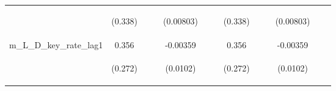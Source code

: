 \documentclass[]{article}
\begin{document}
\begin{center}
\begin{tabular}{lcccccccccccc}
\vspace{4pt} & \begin{footnotesize}(0.338)\end{footnotesize} & \begin{footnotesize}\end{footnotesize} & \begin{footnotesize}\end{footnotesize} & \begin{footnotesize}(0.00803)\end{footnotesize} & \begin{footnotesize}\end{footnotesize} & \begin{footnotesize}\end{footnotesize} & \begin{footnotesize}(0.338)\end{footnotesize} & \begin{footnotesize}\end{footnotesize} & \begin{footnotesize}\end{footnotesize} & \begin{footnotesize}(0.00803)\end{footnotesize} & \begin{footnotesize}\end{footnotesize} & \begin{footnotesize}\end{footnotesize} \\
m\_L\_D\_key\_rate\_lag1 & 0.356 &  &  & -0.00359 &  &  & 0.356 &  &  & -0.00359 &  &  \\
\vspace{4pt} & \begin{footnotesize}(0.272)\end{footnotesize} & \begin{footnotesize}\end{footnotesize} & \begin{footnotesize}\end{footnotesize} & \begin{footnotesize}(0.0102)\end{footnotesize} & \begin{footnotesize}\end{footnotesize} & \begin{footnotesize}\end{footnotesize} & \begin{footnotesize}(0.272)\end{footnotesize} & \begin{footnotesize}\end{footnotesize} & \begin{footnotesize}\end{footnotesize} & \begin{footnotesize}(0.0102)\end{footnotesize} & \begin{footnotesize}\end{footnotesize} & \begin{footnotesize}\end{footnotesize} \\

\end{tabular}
\end{center}
\end{document}
